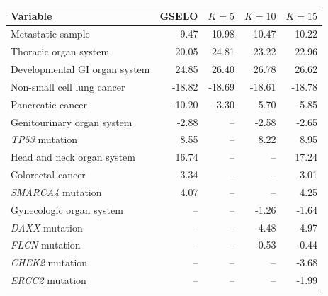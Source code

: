 \begin{tabular}{lrrrr}
\toprule
Variable & GSELO & \(K=5\) & \(K=10\) & \(K=15\)\\
\midrule
Metastatic sample & 9.47 & 10.98 & 10.47 & 10.22\\
Thoracic organ system & 20.05 & 24.81 & 23.22 & 22.96\\
Developmental GI organ system & 24.85 & 26.40 & 26.78 & 26.62\\
Non-small cell lung cancer & -18.82 & -18.69 & -18.61 & -18.78\\
Pancreatic cancer & -10.20 & -3.30 & -5.70 & -5.85\\
Genitourinary organ system & -2.88 & -- & -2.58 & -2.65\\
\textit{TP53} mutation & 8.55 & -- & 8.22 & 8.95\\
Head and neck organ system & 16.74 & -- & -- & 17.24\\
Colorectal cancer & -3.34 & -- & -- & -3.01\\
\textit{SMARCA4} mutation & 4.07 & -- & -- & 4.25\\
Gynecologic organ system & -- & -- & -1.26 & -1.64\\
\textit{DAXX} mutation & -- & -- & -4.48 & -4.97\\
\textit{FLCN} mutation & -- & -- & -0.53 & -0.44\\
\textit{CHEK2} mutation & -- & -- & -- & -3.68\\
\textit{ERCC2} mutation & -- & -- & -- & -1.99\\
\bottomrule
\end{tabular}
